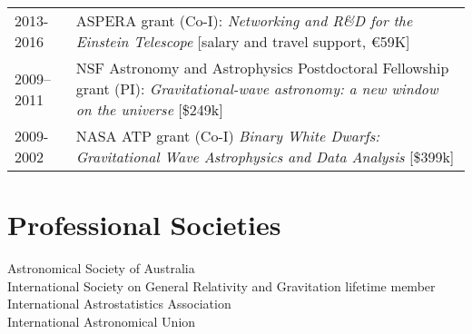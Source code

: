 \documentclass[margin,line]{res}
\begin{document}
\begin{resume}
\begin{tabular}{@{}p{0.8in}p{4.7in}}
2013-2016 & ASPERA grant (Co-I): {\it Networking and R\&D for the Einstein Telescope} [salary and travel support, \euro59K]\\
2009--2011 & NSF Astronomy and Astrophysics Postdoctoral Fellowship grant (PI):  {\it Gravitational-wave astronomy: a new window on the universe} [\$249k]\\
2009-2002 & NASA ATP grant (Co-I) {\it Binary White Dwarfs: Gravitational Wave Astrophysics and Data Analysis} [\$399k]\\
\end{tabular}





\section{\sc Professional Societies}
Astronomical Society of Australia\\
International Society on General Relativity and Gravitation lifetime member\\
International Astrostatistics Association\\
International Astronomical Union



\end{resume}
\end{document}
